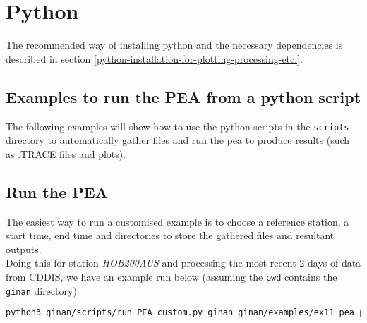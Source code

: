 
\chapter{Python}
The recommended way of installing python and the necessary dependencies is described in section \ref{python-installation-for-plotting-processing-etc.}.

\section{Examples to run the PEA from a python script}\label{examples-to-run-the-pea-from-a-python-script}

The following examples will show how to use the python scripts in the
\texttt{scripts} directory to automatically gather files and run the pea
to produce results (such as .TRACE files and plots).

\section{Run the PEA}\label{run-the-pea}

The easiest way to run a customised example is to choose a reference station, a start
time, end time and directories to store the gathered files and resultant
outputs.\\
Doing this for station \emph{HOB200AUS} and processing the most recent 2 days of data from CDDIS, we have an example run
below (assuming the \texttt{pwd} contains the \texttt{ginan} directory):

\begin{lstlisting}[language=bash]
        python3 ginan/scripts/run_PEA_custom.py ginan ginan/examples/ex11_pea_pp_user_gps.yaml test/out test/data HOB200AUS test/products -ac igr -m_r 2 -o_yml test/test_yaml.yaml
\end{lstlisting}

